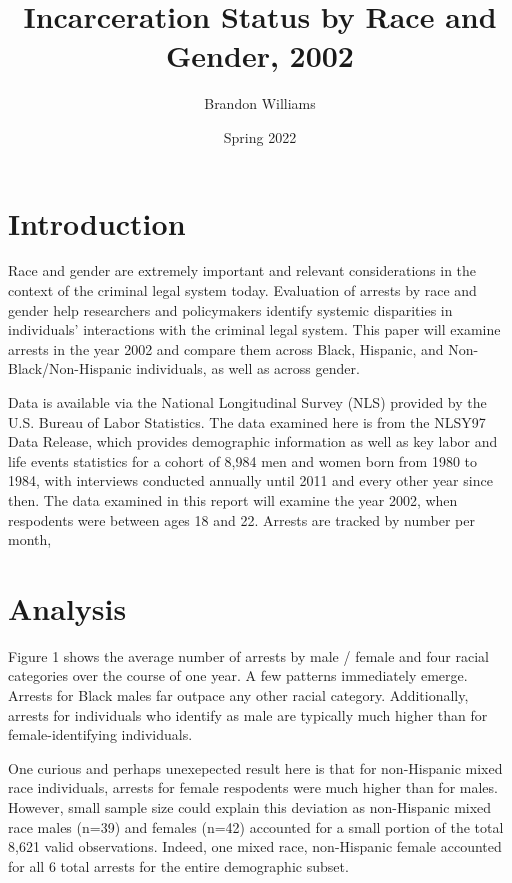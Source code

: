 \documentclass{article}
\author{Brandon Williams}
\title{Incarceration Status by Race and Gender, 2002}
\date{Spring 2022}
\begin{document}
\maketitle

\section{Introduction}

Race and gender are extremely important and relevant considerations in the context of the criminal legal system today. Evaluation of arrests by race and gender help researchers and policymakers identify systemic disparities in individuals' interactions with the criminal legal system. This paper will examine arrests in the year 2002 and compare them across Black, Hispanic, and Non-Black/Non-Hispanic individuals, as well as across gender. 

Data is available via the National Longitudinal Survey (NLS) provided by the U.S. Bureau of Labor Statistics. The data examined here is from the NLSY97 Data Release, which provides demographic information as well as key labor and life events statistics for a cohort of 8,984 men and women born from 1980 to 1984, with interviews conducted annually until 2011 and every other year since then. The data examined in this report will examine the year 2002, when respodents were between ages 18 and 22. Arrests are tracked by number per month, 

\section{Analysis}

Figure 1 shows the average number of arrests by male / female and four racial categories over the course of one year. A few patterns immediately emerge. Arrests for Black males far outpace any other racial category. Additionally, arrests for individuals who identify as male are typically much higher than for female-identifying individuals. 

One curious and perhaps unexepected result here is that for non-Hispanic mixed race individuals, arrests for female respodents were much higher than for males. However, small sample size could explain this deviation as non-Hispanic mixed race males (n=39) and females (n=42) accounted for a small portion of the total 8,621 valid observations. Indeed, one mixed race, non-Hispanic female accounted for all 6 total arrests for the entire demographic subset. 
\end{document}
